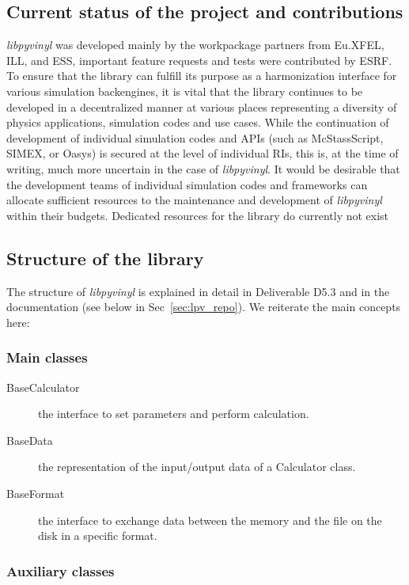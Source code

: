 \documentclass[11pt, a4paper]{article}
\begin{document}
\subsection{Current status of the project and contributions}
\label{sec:lpv_status}
\textit{libpyvinyl} was developed mainly by the workpackage partners from
Eu.XFEL, ILL, and ESS, important feature requests and tests were contributed by
ESRF. To ensure that the library can fulfill its purpose as a harmonization
interface for various simulation backengines, it is vital that the library
continues to be developed in a decentralized manner at various places
representing a diversity of physics applications, simulation codes and use
cases. While the continuation of development of individual simulation codes and
APIs (such as McStassScript, SIMEX, or Oasys) is secured at the level of
individual RIs, this is, at the time of writing, much more uncertain in the case
of \textit{libpyvinyl}. It would be desirable that the development teams of
individual simulation codes and frameworks can allocate sufficient resources to
the maintenance and development of \textit{libpyvinyl} within their budgets.
Dedicated resources for the  library do currently not exist

\subsection{Structure of the library}
\label{sec:lpv_structure}
The structure of \textit{libpyvinyl} is explained in detail in Deliverable D5.3
and in the documentation (see below in Sec~\ref{sec:lpv_repo}). We reiterate the
main concepts here:

\subsubsection{Main classes}
\label{sec:lpv_main_classes}

\begin{description}
\item[BaseCalculator] the interface to set parameters and perform calculation.
\item[BaseData]   the representation of the input/output data of a Calculator class.
\item[BaseFormat]   the interface to exchange data between the memory and the file on the disk in a specific format.
\end{description}

\subsubsection{Auxiliary classes}
\label{sec:lpv_aux}
\end{document}
